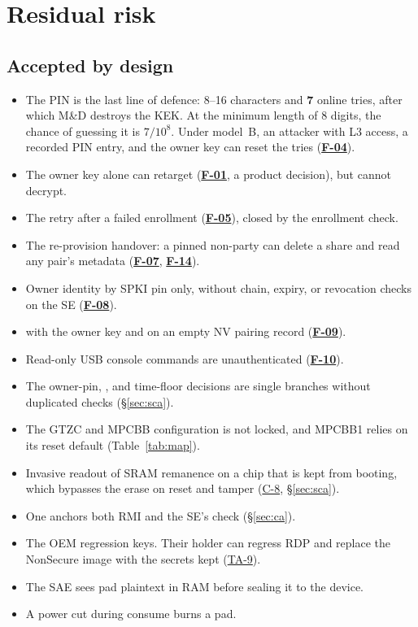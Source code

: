 \documentclass[11pt,a4paper]{article}
\newcommand{\fid}[1]{\textbf{#1}}
\begin{document}
\section{Residual risk}\label{sec:residual}
\subsection{Accepted by design}
\begin{itemize}
\item The PIN is the last line of defence: 8--16 characters and \textbf{7} online tries, after which M\&D destroys the KEK. At the minimum length of 8 digits, the chance of guessing it is $7/10^{8}$. Under model~B, an attacker with L3 access, a recorded PIN entry, and the owner key can reset the tries (\hyperref[f:F-04]{\fid{F-04}}).
\item The owner key alone can retarget  (\hyperref[f:F-01]{\fid{F-01}}, a product decision), but cannot decrypt.
\item The  retry after a failed enrollment (\hyperref[f:F-05]{\fid{F-05}}), closed by the enrollment check.
\item The re-provision handover: a pinned non-party can delete a share and read any pair's metadata (\hyperref[f:F-07]{\fid{F-07}}, \hyperref[f:F-14]{\fid{F-14}}).
\item Owner identity by SPKI pin only, without chain, expiry, or revocation checks on the SE (\hyperref[f:F-08]{\fid{F-08}}).
\item {} with the owner key and  on an empty NV pairing record (\hyperref[f:F-09]{\fid{F-09}}).
\item Read-only USB console commands are unauthenticated (\hyperref[f:F-10]{\fid{F-10}}).
\item The owner-pin, , and time-floor decisions are single branches without duplicated checks (\S\ref{sec:sca}).
\item The GTZC and MPCBB configuration is not locked, and MPCBB1 relies on its reset default (Table~\ref{tab:map}).
\item Invasive readout of SRAM remanence on a chip that is kept from booting, which bypasses the erase on reset and tamper (\hyperref[c:C-8]{C-8}, \S\ref{sec:sca}).
\item One  anchors both RMI and the SE's  check (\S\ref{sec:ca}).
\item The OEM regression keys. Their holder can regress RDP and replace the NonSecure image with the secrets kept (\hyperref[ta:TA-9]{TA-9}).
\item The SAE sees pad plaintext in RAM before sealing it to the device.
\item A power cut during consume burns a pad.
\end{itemize}
\end{document}
